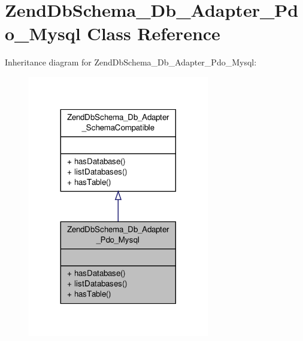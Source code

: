 \hypertarget{classZendDbSchema__Db__Adapter__Pdo__Mysql}{\section{Zend\-Db\-Schema\-\_\-\-Db\-\_\-\-Adapter\-\_\-\-Pdo\-\_\-\-Mysql Class Reference}
\label{classZendDbSchema__Db__Adapter__Pdo__Mysql}
}


Inheritance diagram for Zend\-Db\-Schema\-\_\-\-Db\-\_\-\-Adapter\-\_\-\-Pdo\-\_\-\-Mysql\-:\nopagebreak
\begin{figure}[H]
\begin{center}
\leavevmode
\includegraphics[width=224pt]{classZendDbSchema__Db__Adapter__Pdo__Mysql__inherit__graph}
\end{center}
\end{figure}


